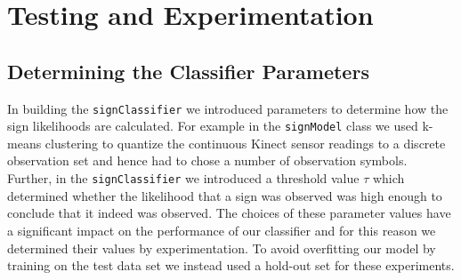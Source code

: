 \chapter{Testing and Experimentation}
\ifpdf
    \graphicspath{{Chapter3/Chapter3Figs/PNG/}{Chapter3/Chapter3Figs/PDF/}{Chapter3/Chapter3Figs/}}
\else
    \graphicspath{{Chapter3/Chapter3Figs/EPS/}{Chapter3/Chapter3Figs/}}
\fi

\section{Determining the Classifier Parameters}
In building the \verb|signClassifier| we introduced parameters to determine how the sign likelihoods are calculated. For example in the \verb|signModel| class we used k-means clustering to quantize the continuous Kinect sensor readings to a discrete observation set and hence had to chose a number of observation symbols. Further, in the \verb|signClassifier| we introduced a threshold value $\tau$ which determined whether the likelihood that a sign was observed was high enough to conclude that it indeed was observed. The choices of these parameter values have a significant impact on the performance of our classifier and for this reason we determined their values by experimentation. To avoid overfitting our model by training on the test data set we instead used a hold-out set for these experiments.

